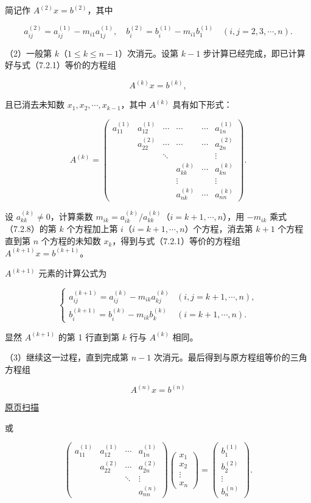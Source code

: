 \documentclass[
  10pt,
  fontset=fandol]{ctexart}
\begin{document}
简记作 \(A^{(2)}x=b^{(2)}\)，其中

\[
a_{ij}^{(2)}=a_{ij}^{(1)}-m_{i1}a_{1j}^{(1)},\quad
b_i^{(2)}=b_i^{(1)}-m_{i1}b_1^{(1)}\quad(i,j=2,3,\cdots,n).
\]

（2）一般第 \(k\)（\(1\le k\le n-1\)）次消元。设第 \(k-1\) 步计算已经完成，即已计算好与式（7.2.1）等价的方程组

\[A^{(k)}x=b^{(k)},\tag{7.2.8}\]

且已消去未知数 \(x_1,x_2,\cdots,x_{k-1}\)，其中 \(A^{(k)}\) 具有如下形式：

\[
A^{(k)}=\begin{pmatrix}
a_{11}^{(1)}&a_{12}^{(1)}&\cdots&\cdots&\cdots&a_{1n}^{(1)}\\
&a_{22}^{(2)}&\cdots&\cdots&\cdots&a_{2n}^{(2)}\\
&&\ddots&&&\vdots\\
&&&a_{kk}^{(k)}&\cdots&a_{kn}^{(k)}\\
&&&\vdots&&\vdots\\
&&&a_{nk}^{(k)}&\cdots&a_{nn}^{(k)}
\end{pmatrix}.
\]

设 \(a_{kk}^{(k)}\ne0\)，计算乘数 \(m_{ik}=a_{ik}^{(k)}/a_{kk}^{(k)}\)（\(i=k+1,\cdots,n\)），用 \(-m_{ik}\) 乘式（7.2.8）的第 \(k\) 个方程加上第 \(i\)（\(i=k+1,\cdots,n\)）个方程，消去第 \(k+1\) 个方程直到第 \(n\) 个方程的未知数 \(x_k\)，得到与式（7.2.1）等价的方程组 \(A^{(k+1)}x=b^{(k+1)}\)。

\(A^{(k+1)}\) 元素的计算公式为

\[
\begin{cases}
a_{ij}^{(k+1)}=a_{ij}^{(k)}-m_{ik}a_{kj}^{(k)}& (i,j=k+1,\cdots,n),\\
b_i^{(k+1)}=b_i^{(k)}-m_{ik}b_k^{(k)}& (i=k+1,\cdots,n).
\end{cases}
\tag{7.2.9}
\]

显然 \(A^{(k+1)}\) 的第 1 行直到第 \(k\) 行与 \(A^{(k)}\) 相同。

（3）继续这一过程，直到完成第 \(n-1\) 次消元。最后得到与原方程组等价的三角方程组

\[A^{(n)}x=b^{(n)}\tag{7.2.10}\]

\href{../../source-images/pdf-180.jpeg}{原页扫描}

或

\[
\begin{pmatrix}
a_{11}^{(1)}&a_{12}^{(1)}&\cdots&a_{1n}^{(1)}\\
&a_{22}^{(2)}&\cdots&a_{2n}^{(2)}\\
&&\ddots&\vdots\\
&&&a_{nn}^{(n)}
\end{pmatrix}
\begin{pmatrix}x_1\\x_2\\\vdots\\x_n\end{pmatrix}
=\begin{pmatrix}b_1^{(1)}\\b_2^{(2)}\\\vdots\\b_n^{(n)}\end{pmatrix}.
\]
\end{document}

